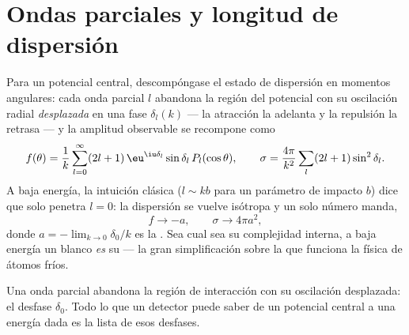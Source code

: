\section{Ondas parciales y longitud de dispersión}

\begin{theorem}[Desfases]\label{thm:b3:scattering-theory:partial}
Para un potencial central, descompóngase el estado de dispersión en
momentos angulares: cada onda parcial $l$ abandona la región del potencial
con su oscilación radial \emph{desplazada} en una fase $\delta_l(k)$
--- la atracción la adelanta y la repulsión la retrasa --- y la amplitud
observable se recompone como
\[
f(\theta) = \frac1k\sum_{l=0}^\infty(2l+1)\,\eu^{\iu\delta_l}
\sin\delta_l\,P_l(\cos\theta) , \qquad
\sigma = \frac{4\pi}{k^2}\sum_l(2l+1)\sin^2\delta_l .
\]
A baja energía, la intuición clásica ($l \sim kb$ para un parámetro de
impacto $b$) dice que solo penetra $l = 0$: la dispersión se vuelve
isótropa y un solo número manda,
\[
f \to -a , \qquad \sigma \to 4\pi a^2 ,
\]
donde $a = -\lim_{k\to0}\delta_0/k$ es la \emph{}. Sea cual sea su complejidad interna, a baja energía un blanco
\emph{es} su  --- la gran simplificación sobre la que
funciona la física de átomos fríos.
\end{theorem}
\admitted

\begin{omfigure}

{\small Una onda parcial abandona la región de interacción con su
oscilación desplazada: el desfase $\delta_0$. Todo lo que un detector puede
saber de un potencial central a una energía dada es la lista de esos
desfases.}
\end{omfigure}


